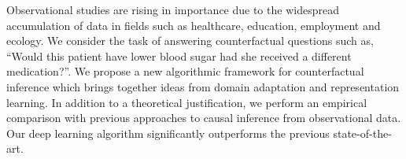 Observational studies are rising in importance due to the widespread accumulation of data in fields such as healthcare, education, employment and ecology. We consider the task of answering counterfactual questions such as, ``Would this patient have lower blood sugar had she received a different medication?''.
We propose a new algorithmic framework for counterfactual inference which brings together ideas from domain adaptation and representation learning. In addition to a theoretical justification, we perform an empirical comparison with previous approaches to causal inference from observational data. Our deep learning algorithm significantly outperforms the previous state-of-the-art.
